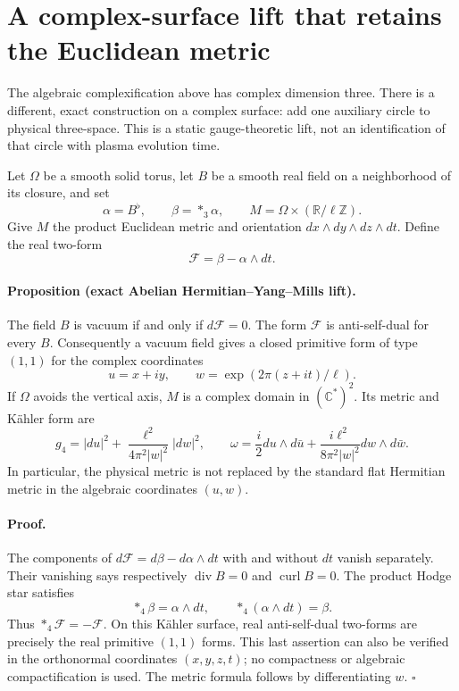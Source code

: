 \section{A complex-surface lift that retains the Euclidean metric}

The algebraic complexification above has complex dimension three. There is a different, exact construction on a complex surface: add one auxiliary circle to physical three-space. This is a static gauge-theoretic lift, not an identification of that circle with plasma evolution time.

Let $\Omega$ be a smooth solid torus, let $B$ be a smooth real field on a neighborhood of its closure, and set
\[
\alpha=B^\flat,\qquad \beta=*_{3}\alpha,\qquad
M=\Omega\times(\mathbb R/\ell\mathbb Z).
\]
Give $M$ the product Euclidean metric and orientation $dx\wedge dy\wedge dz\wedge dt$. Define the real two-form
\[
\mathcal F=\beta-\alpha\wedge dt.
\]

\paragraph{Proposition (exact Abelian Hermitian--Yang--Mills lift).}
The field $B$ is vacuum if and only if $d\mathcal F=0$. The form $\mathcal F$ is anti-self-dual for every $B$. Consequently a vacuum field gives a closed primitive form of type $(1,1)$ for the complex coordinates
\[
u=x+iy,\qquad w=\exp(2\pi(z+it)/\ell).
\]
If $\Omega$ avoids the vertical axis, $M$ is a complex domain in $(\mathbb C^*)^2$. Its metric and Kähler form are
\[
g_4=|du|^2+\frac{\ell^2}{4\pi^2|w|^2}|dw|^2,
\qquad
\omega=\frac i2du\wedge d\bar u+
\frac{i\ell^2}{8\pi^2|w|^2}dw\wedge d\bar w.
\]
In particular, the physical metric is not replaced by the standard flat Hermitian metric in the algebraic coordinates $(u,w)$.

\paragraph{Proof.}
The components of $d\mathcal F=d\beta-d\alpha\wedge dt$ with and without $dt$ vanish separately. Their vanishing says respectively $\operatorname{div}B=0$ and $\operatorname{curl}B=0$. The product Hodge star satisfies
\[
*_{4}\beta=\alpha\wedge dt,\qquad
*_{4}(\alpha\wedge dt)=\beta.
\]
Thus $*_{4}\mathcal F=-\mathcal F$. On this Kähler surface, real anti-self-dual two-forms are precisely the real primitive $(1,1)$ forms. This last assertion can also be verified in the orthonormal coordinates $(x,y,z,t)$; no compactness or algebraic compactification is used. The metric formula follows by differentiating $w$. $\square$

